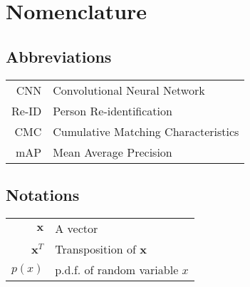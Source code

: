 \chapter*{Nomenclature}

\section*{Abbreviations}

\begin{onehalfspace}

\begin{tabular}{rl}
CNN      & Convolutional Neural Network \\
Re-ID    & Person Re-identification \\
CMC      & Cumulative Matching Characteristics \\
mAP      & Mean Average Precision \\
\end{tabular}

\section*{Notations}

\begin{tabular}{rl}
$\mathbf{x}$      & A vector\\
$\mathbf{x}^T$    & Transposition of $\mathbf{x}$\\
$p(x)$            & p.d.f. of random variable $x$  \\
\end{tabular}

\end{onehalfspace}
